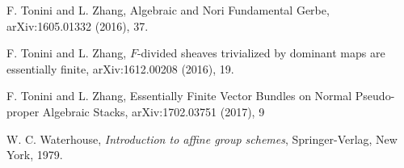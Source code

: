 \documentclass[12pt,reqno]{amsart}
\theoremstyle{plain}
\theoremstyle{definition}
\numberwithin{thm}{section}
\newcounter{x}\setcounter{x}{1}
\theoremstyle{plain}
\begin{document}
\begin{thebibliography}{9999999}
 F. Tonini and L. Zhang, Algebraic and Nori Fundamental Gerbe, 
arXiv:1605.01332 (2016), 37.

 F. Tonini and L. Zhang, $F$-divided sheaves trivialized by dominant 
maps are essentially finite, arXiv:1612.00208 (2016), 19.

 F. Tonini and L. Zhang, Essentially Finite Vector Bundles on 
Normal Pseudo-proper Algebraic Stacks, arXiv:1702.03751 (2017), 9

 W. C. Waterhouse, \textit{Introduction to affine group schemes}, 
Springer-Verlag, New York, 1979.

\end{thebibliography}
\end{document}
